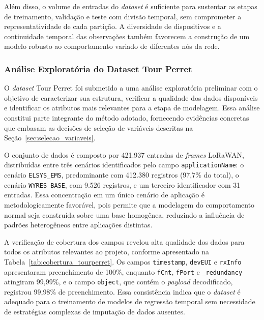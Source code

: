 Além disso, o volume de entradas do \textit{dataset} é suficiente para 
sustentar as etapas de treinamento, validação e teste com divisão temporal, 
sem comprometer a representatividade de cada partição. A diversidade de 
dispositivos e a continuidade temporal das observações também favorecem a 
construção de um modelo robusto ao comportamento variado de diferentes nós 
da rede.


\subsubsection{Análise Exploratória do Dataset Tour Perret}

O \textit{dataset} Tour Perret foi submetido a uma análise exploratória 
preliminar com o objetivo de caracterizar sua estrutura, verificar a 
qualidade dos dados disponíveis e identificar os atributos mais relevantes 
para a etapa de modelagem. Essa análise constitui parte integrante do método 
adotado, fornecendo evidências concretas que embasam as decisões de seleção 
de variáveis descritas na Seção~\ref{sec:selecao_variaveis}.

O conjunto de dados é composto por 421.937 entradas de \textit{frames} 
LoRaWAN, distribuídas entre três cenários identificados pelo campo 
\texttt{applicationName}: o cenário \texttt{ELSYS\_EMS}, predominante com 
412.380 registros (97,7\% do total), o cenário \texttt{WYRES\_BASE}, com 
9.526 registros, e um terceiro identificador com 31 entradas. Essa 
concentração em um único cenário de aplicação é metodologicamente favorável, 
pois permite que a modelagem do comportamento normal seja construída sobre 
uma base homogênea, reduzindo a influência de padrões heterogêneos entre 
aplicações distintas.

A verificação de cobertura dos campos revelou alta qualidade dos dados para 
todos os atributos relevantes ao projeto, conforme apresentado na 
Tabela~\ref{tab:cobertura_tourperret}. Os campos \texttt{timestamp}, 
\texttt{devEUI} e \texttt{rxInfo} apresentaram preenchimento de 100\%, 
enquanto \texttt{fCnt}, \texttt{fPort} e \texttt{\_redundancy} atingiram 
99,99\%, e o campo \texttt{object}, que contém o \textit{payload} 
decodificado, registrou 99,98\% de preenchimento. Essa consistência indica 
que o \textit{dataset} é adequado para o treinamento de modelos de regressão 
temporal sem necessidade de estratégias complexas de imputação de dados 
ausentes.

